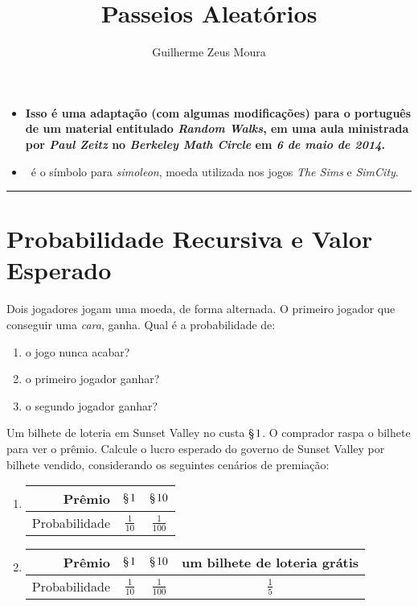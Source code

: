 \documentclass[10pt, a4paper]{article}
\title{Passeios Aleatórios}
\author{Guilherme Zeus Moura}
\newcommand{\coin}{\text{§}\hspace{.3ex}}
\begin{document}
	
	\zeustitle

	\begin{itemize}
	\item \textbf{Isso é uma adaptação (com algumas modificações) para o português de um material entitulado \emph{Random Walks}, em uma aula ministrada por \emph{Paul Zeitz} no \emph{Berkeley Math Circle} em \emph{6 de maio de 2014}.}
	\item \coin\ é o símbolo para \emph{simoleon}, moeda utilizada nos jogos \emph{The Sims} e \emph{SimCity}.
	\end{itemize}
		
	\begin{center} \rule{15cm}{0.5pt} \end{center}

	\section*{Probabilidade Recursiva e Valor Esperado}

	\begin{prob}
		Dois jogadores jogam uma moeda, de forma alternada. O primeiro jogador que conseguir uma \emph{cara}, ganha. Qual é a probabilidade de:
		\begin{enumerate}[label = (\alph*)]
			\item o jogo nunca acabar?
			\item o primeiro jogador ganhar?
			\item o segundo jogador ganhar?
		\end{enumerate}
	\end{prob}

	\begin{prob}
		Um bilhete de loteria em Sunset Valley no custa $\coin 1$. O comprador raspa o bilhete para ver o prêmio. Calcule o lucro esperado do governo de Sunset Valley por bilhete vendido, considerando os seguintes cenários de premiação:
		\begin{enumerate}[label = (\alph*)]
			\item
				\begin{tabular}{r||c|c}
					Prêmio & $\coin 1$ & $\coin 10$ \\\hline
					Probabilidade & $\frac{1}{10}$ & $\frac{1}{100}$
				\end{tabular}
			\item
				\begin{tabular}{r||c|c|c}
					Prêmio & $\coin 1$ & $\coin 10$ & um bilhete de loteria grátis \\\hline
					Probabilidade & $\frac{1}{10}$ & $\frac{1}{100}$ & $\frac{1}{5}$ 
				\end{tabular}

		\end{enumerate}
	\end{prob}
\end{document}
